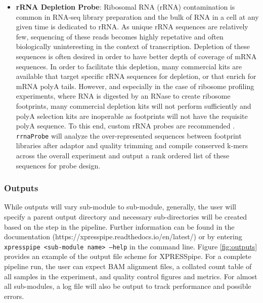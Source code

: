 \documentclass[11pt, a4paper, oneside]{article}
\begin{document}
\begin{enumerate}
\begin{itemize}
      \item \textbf{rRNA Depletion Probe}: Ribosomal RNA (rRNA) contamination is common in RNA-seq library preparation and the bulk of RNA in a cell at any given time is dedicated to rRNA. As unique rRNA sequences are relatively few, sequencing of these reads becomes highly repetative and often biologically uninteresting in the context of transcription. Depletion of these sequences is often desired in order to have better depth of coverage of mRNA sequences. In order to facilitate this depletion, many commercial kits are available that target specific rRNA sequences for depletion, or that enrich for mRNA polyA tails. However, and especially in the case of ribosome profiling experiments, where RNA is digested by an RNase to create ribosome footprints, many commercial depletion kits will not perform sufficiently and polyA selection kits are inoperable as footprints will not have the requisite polyA sequence. To this end, custom rRNA probes are recommended \cite{ingolia_meth, ingolia_science}. \texttt{rrnaProbe} will analyze the over-represented sequences between footprint libraries after adaptor and quality trimming and compile conserved k-mers across the overall experiment and output a rank ordered list of these sequences for probe design.

    \end{itemize}
\end{enumerate}


\subsubsection{Outputs}
While outputs will vary sub-module to sub-module, generally, the user will specify a parent output directory and necessary sub-directories will be created based on the step in the pipeline. Further information can be found in the documentation (https://xpresspipe.readthedocs.io/en/latest/) or by entering \texttt{xpresspipe \textless sub-module name\textgreater \ --help} in the command line. Figure \ref{fig:outputs} provides an example of the output file scheme for XPRESSpipe. For a complete pipeline run, the user can expect BAM alignment files, a collated count table of all samples in the experiment, and quality control figures and metrics. For almost all sub-modules, a log file will also be output to track performance and possible errors.
\end{document}
